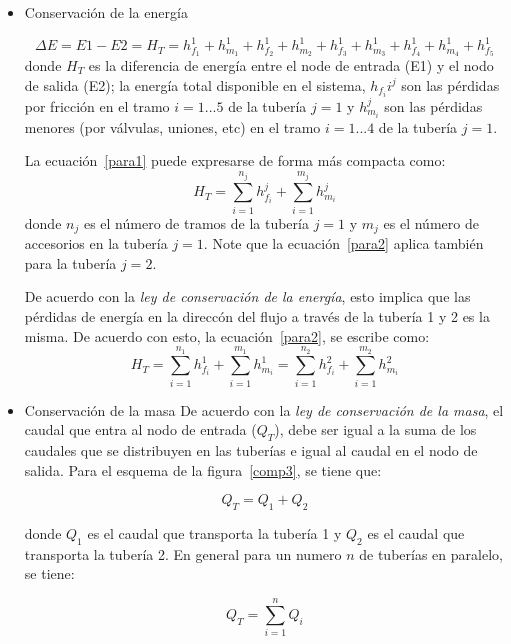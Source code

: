 \documentclass[10pt, oneside]{article}
\begin{document}
\begin{itemize}
\item Conservaci\'on de la energ\'ia

\begin{equation}
\Delta E = E1-E2 = H_T = h_{f_1}^1 + h_{m_1}^1 + h_{f_2}^1 + h_{m_2}^1 + h_{f_3}^1 + h_{m_3}^1 + h_{f_4}^1 + h_{m_4}^1 + h_{f_5}^1
\label{para1}
\end{equation}
donde $H_T$ es la diferencia de energ\'ia entre el node de entrada (E1) y el nodo de salida (E2); la energ\'ia total disponible en el sistema, $h_{f_i}i^j$ son las p\'erdidas por fricci\'on en el tramo $i=1...5$ de la tuber\'ia $j=1$ y $h_{m_i}^j$ son las p\'erdidas menores (por v\'alvulas, uniones, etc) en el tramo $i=1...4$ de la tuber\'ia $j=1$.

La ecuaci\'on~\ref{para1} puede expresarse de forma m\'as compacta como:
\begin{equation}
H_T = \sum_{i=1}^{n_j} h_{f_i}^j + \sum_{i=1}^{m_j} h_{m_i}^j
\label{para2}
\end{equation}
donde $n_j$ es el n\'umero de tramos de la tuber\'ia $j=1$ y $m_j$ es el n\'umero de accesorios en la tuber\'ia $j=1$. Note que la ecuaci\'on~\ref{para2} aplica tambi\'en para la tuber\'ia $j=2$.

De acuerdo con la \emph{ley de conservaci\'on de la energ\'ia}, esto implica que las p\'erdidas de energ\'ia en la direcc\'on del flujo a trav\'es de la tuber\'ia 1 y 2 es la misma. De acuerdo con esto, la ecuaci\'on~\ref{para2}, se escribe como:
\begin{equation}
H_T = \sum_{i=1}^{n_1} h_{f_i}^1 + \sum_{i=1}^{m_1} h_{m_i}^1 = \sum_{i=1}^{n_2} h_{f_i}^2 + \sum_{i=1}^{m_2} h_{m_i}^2
\label{para3}
\end{equation}

\item Conservaci\'on de la masa
De acuerdo con la \emph{ley de conservaci\'on de la masa}, el caudal que entra al nodo de entrada ($Q_T$), debe ser igual a la suma de los caudales que se distribuyen en las tuber\'ias e igual al caudal en el nodo de salida. Para el esquema de la figura~\ref{comp3}, se tiene que:

\begin{equation}
Q_T = Q_1 + Q_2
\label{para4}
\end{equation}

donde $Q_1$ es el caudal que transporta la tuber\'ia 1 y $Q_2$ es el caudal que transporta la tuber\'ia 2. En general para un numero $n$ de tuber\'ias en paralelo, se tiene:

\begin{equation}
Q_T = \sum_{i=1}^n Q_i
\label{para5}
\end{equation}
\end{itemize}
\end{document}
